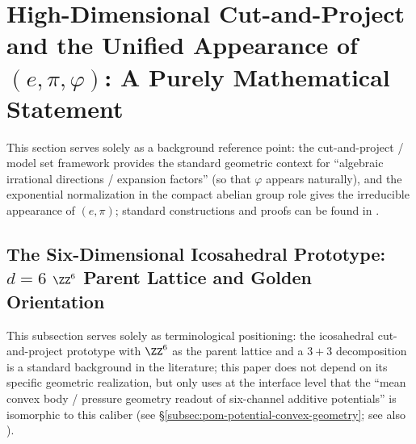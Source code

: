 \section{High-Dimensional Cut-and-Project and the Unified Appearance of \texorpdfstring{$(e,\pi,\varphi)$}{(e, pi, varphi)}: A Purely Mathematical Statement}\label{sec:high-dimensional-cut-project}

This section serves solely as a background reference point: the cut-and-project / model set framework provides the standard geometric context for ``algebraic irrational directions / expansion factors'' (so that \(\varphi\) appears naturally), and the exponential normalization in the compact abelian group role gives the irreducible appearance of \((e,\pi)\); standard constructions and proofs can be found in \cite{BaakeGrimmAperiodicOrder1,MeyerAlgebraicNumbers,QueffelecSubstitution}.

\subsection{The Six-Dimensional Icosahedral Prototype: \texorpdfstring{$d=6$}{d=6} \texorpdfstring{$\ZZ^6$}{Z6} Parent Lattice and Golden Orientation}\label{subsec:icosahedral-6d-model-set}
This subsection serves solely as terminological positioning: the icosahedral cut-and-project prototype with \(\ZZ^6\) as the parent lattice and a \(3{+}3\) decomposition is a standard background in the literature; this paper does not depend on its specific geometric realization, but only uses at the interface level that the ``mean convex body / pressure geometry readout of six-channel additive potentials'' is isomorphic to this caliber (see \S\ref{subsec:pom-potential-convex-geometry}; see also \cite{BaakeGrimmAperiodicOrder1,MeyerAlgebraicNumbers,QueffelecSubstitution}).
